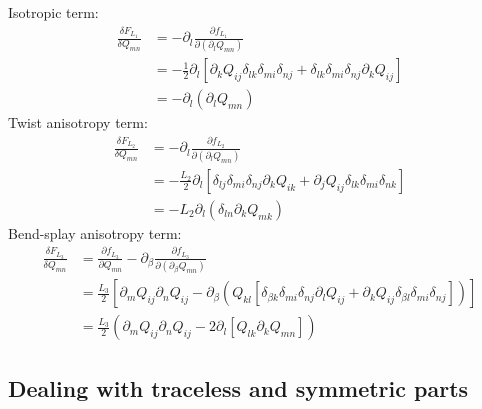 \documentclass[reqno]{article}
\begin{document}
Isotropic term:
\begin{equation}
\begin{split}
    \frac{\delta F_{L_1}}{\delta Q_{mn}}
    &=
    -\partial_l \frac{\partial f_{L_1}}{\partial \left(\partial_l Q_{mn}\right)} \\
    &=
    -\frac{1}{2} \partial_l \left[
        \partial_k Q_{ij} \delta_{lk} \delta_{mi} \delta_{nj}
        + \delta_{lk} \delta_{mi} \delta_{nj} \partial_k Q_{ij}
    \right] \\
    &=
    -\partial_l \left( \partial_l Q_{mn} \right)
\end{split}
\end{equation}
Twist anisotropy term:
\begin{equation}
\begin{split}
    \frac{\delta F_{L_2}}{\delta Q_{mn}}
    &=
    -\partial_l \frac{\partial f_{L_2}}{\partial \left(\partial_l Q_{mn}\right)} \\
    &=
    -\frac{L_2}{2} \partial_l \left[
        \delta_{lj} \delta_{mi} \delta_{nj} \partial_k Q_{ik}
        + \partial_j Q_{ij} \delta_{lk} \delta_{mi} \delta_{nk}
    \right] \\
    &=
    -L_2 \partial_l \left( \delta_{ln} \partial_k Q_{mk} \right)
\end{split}
\end{equation}
Bend-splay anisotropy term:
\begin{equation}
\begin{split}
    \frac{\delta F_{L_3}}{\delta Q_{mn}}
    &=
    \frac{\partial f_{L_3}}{\partial Q_{mn}} - \partial_\beta \frac{\partial f_{L_3}}{\partial \left(\partial_\beta Q_{mn}\right)} \\
    &=
    \frac{L_3}{2} \left[
        \partial_m Q_{ij} \partial_n Q_{ij}
        -
        \partial_\beta \left(
            Q_{kl} \left[ 
                \delta_{\beta k} \delta_{mi} \delta_{nj} \partial_l Q_{ij}
                + \partial_k Q_{ij} \delta_{\beta l} \delta_{mi} \delta_{nj}
            \right]
        \right)
    \right] \\
    &=
    \frac{L_3}{2} \left(
        \partial_m Q_{ij} \partial_n Q_{ij}
        -
        2 \partial_l \left[
            Q_{lk} \partial_k Q_{mn}
        \right]
    \right)
\end{split}
\end{equation}

\subsection{Dealing with traceless and symmetric parts}
\end{document}
